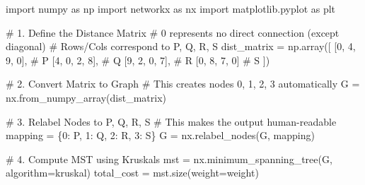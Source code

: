 \documentclass[
  letterpaper,
  DIV=11,
  numbers=noendperiod]{scrreprt}
\newenvironment{Shaded}{\begin{snugshade}}{\end{snugshade}}
\newcommand{\CommentTok}[1]{\textcolor[rgb]{0.37,0.37,0.37}{#1}}
\newcommand{\DecValTok}[1]{\textcolor[rgb]{0.68,0.00,0.00}{#1}}
\newcommand{\ImportTok}[1]{\textcolor[rgb]{0.00,0.46,0.62}{#1}}
\newcommand{\NormalTok}[1]{\textcolor[rgb]{0.00,0.23,0.31}{#1}}
\newcommand{\OperatorTok}[1]{\textcolor[rgb]{0.37,0.37,0.37}{#1}}
\newcommand{\StringTok}[1]{\textcolor[rgb]{0.13,0.47,0.30}{#1}}
\begin{document}
\begin{Shaded}
\begin{Highlighting}[]
\ImportTok{import}\NormalTok{ numpy }\ImportTok{as}\NormalTok{ np}
\ImportTok{import}\NormalTok{ networkx }\ImportTok{as}\NormalTok{ nx}
\ImportTok{import}\NormalTok{ matplotlib.pyplot }\ImportTok{as}\NormalTok{ plt}

\CommentTok{\# 1. Define the Distance Matrix}
\CommentTok{\# 0 represents no direct connection (except diagonal)}
\CommentTok{\# Rows/Cols correspond to P, Q, R, S}
\NormalTok{dist\_matrix }\OperatorTok{=}\NormalTok{ np.array([}
\NormalTok{    [}\DecValTok{0}\NormalTok{, }\DecValTok{4}\NormalTok{, }\DecValTok{9}\NormalTok{, }\DecValTok{0}\NormalTok{],  }\CommentTok{\# P}
\NormalTok{    [}\DecValTok{4}\NormalTok{, }\DecValTok{0}\NormalTok{, }\DecValTok{2}\NormalTok{, }\DecValTok{8}\NormalTok{],  }\CommentTok{\# Q}
\NormalTok{    [}\DecValTok{9}\NormalTok{, }\DecValTok{2}\NormalTok{, }\DecValTok{0}\NormalTok{, }\DecValTok{7}\NormalTok{],  }\CommentTok{\# R}
\NormalTok{    [}\DecValTok{0}\NormalTok{, }\DecValTok{8}\NormalTok{, }\DecValTok{7}\NormalTok{, }\DecValTok{0}\NormalTok{]   }\CommentTok{\# S}
\NormalTok{])}

\CommentTok{\# 2. Convert Matrix to Graph}
\CommentTok{\# This creates nodes 0, 1, 2, 3 automatically}
\NormalTok{G }\OperatorTok{=}\NormalTok{ nx.from\_numpy\_array(dist\_matrix)}

\CommentTok{\# 3. Relabel Nodes to P, Q, R, S}
\CommentTok{\# This makes the output human{-}readable}
\NormalTok{mapping }\OperatorTok{=}\NormalTok{ \{}\DecValTok{0}\NormalTok{: }\StringTok{\textquotesingle{}P\textquotesingle{}}\NormalTok{, }\DecValTok{1}\NormalTok{: }\StringTok{\textquotesingle{}Q\textquotesingle{}}\NormalTok{, }\DecValTok{2}\NormalTok{: }\StringTok{\textquotesingle{}R\textquotesingle{}}\NormalTok{, }\DecValTok{3}\NormalTok{: }\StringTok{\textquotesingle{}S\textquotesingle{}}\NormalTok{\}}
\NormalTok{G }\OperatorTok{=}\NormalTok{ nx.relabel\_nodes(G, mapping)}

\CommentTok{\# 4. Compute MST using Kruskal\textquotesingle{}s}
\NormalTok{mst }\OperatorTok{=}\NormalTok{ nx.minimum\_spanning\_tree(G, algorithm}\OperatorTok{=}\StringTok{\textquotesingle{}kruskal\textquotesingle{}}\NormalTok{)}
\NormalTok{total\_cost }\OperatorTok{=}\NormalTok{ mst.size(weight}\OperatorTok{=}\StringTok{\textquotesingle{}weight\textquotesingle{}}\NormalTok{)}


\end{Highlighting}
\end{Shaded}
\end{document}
